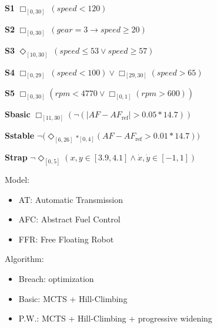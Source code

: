 \documentclass[a0paper,portrait]{baposter}
\newcommand{\speed}{\mathit{speed}}
\newcommand{\rpm}{\mathit{rpm}}
\newcommand{\gear}{\mathit{gear}}
\newcommand{\AF}{\mathit{AF}}
\newcommand{\AFref}{\mathit{AF}_\text{ref}}
\newcommand{\DiaOp}[1]{\Diamond_{#1}}
\newcommand{\BoxOp}[1]{\square_{#1}}
\begin{document}
\begin{poster}
{{}


\begin{minipage}[h]{0.53\textwidth}
\begin{small}
\textbf{S1} $\Box_{[0,30]}~(\speed < 120)$

\textbf{S2} $\Box_{[0,30]}~(\gear = 3 \to \speed \ge 20)$

\textbf{S3} $\Diamond_{[10,30]}~(\speed \le 53 \lor \speed \ge 57)$

\textbf{S4} $\Box_{[0,29]}~(\speed < 100) \lor \Box_{[29,30]}(\speed > 65)$

\textbf{S5} $\Box_{[0,30]}(\rpm < 4770 \lor \Box_{[0,1]}(\rpm > 600))$ 

\textbf{Sbasic} $\Box_{[11,30]}(\neg(|\AF-\AFref|>0.05*14.7))$


\textbf{Sstable} $\neg(\DiaOp{[6,26]}{\BoxOp{[0,4]}{(\AF - \AFref > 0.01 * 14.7))}}$

\textbf{Strap} $\neg\DiaOp{[0,5]}(x,y\in[3.9,4.1]\wedge\dot{x},\dot{y}\in [-1,1])$
\end{small}

\end{minipage}
\begin{minipage}[h]{0.45\textwidth}
\begin{small}
\raggedright Model:
\begin{itemize}
\vspace{-0.6em}
\item AT: Automatic Transmission
\vspace{-0.6em}
\item AFC: Abstract Fuel Control
\vspace{-0.6em}
\item FFR: Free Floating Robot
\vspace{-0.6em}
\end{itemize}

Algorithm:
\begin{itemize}
\vspace{-0.6em}
\item Breach: optimization
\vspace{-0.6em}
\item Basic: MCTS + Hill-Climbing
\vspace{-0.6em}
\item P.W.: MCTS + Hill-Climbing + progressive widening
\vspace{-0.6em}
\end{itemize}

\end{small}


\end{minipage}}
\end{poster}
\end{document}
